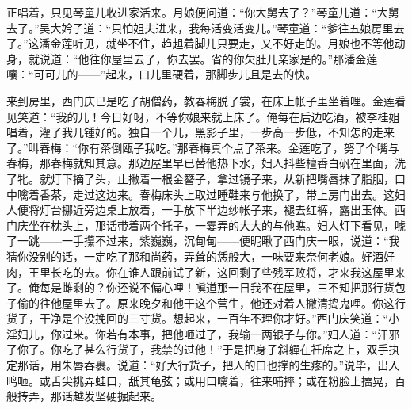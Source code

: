 正唱着，只见琴童儿收进家活来。月娘便问道：“你大舅去了？”琴童儿道：“大舅去了。”吴大妗子道：“只怕姐夫进来，我每活变活变儿。”琴童道：“爹往五娘房里去了。”这潘金莲听见，就坐不住，趋趄着脚儿只要走，又不好走的。月娘也不等他动身，就说道：“他往你屋里去了，你去罢。省的你欠肚儿亲家是的。”那潘金莲嚷：“可可儿的——”起来，口儿里硬着，那脚步儿且是去的快。

来到房里，西门庆已是吃了胡僧药，教春梅脱了裳，在床上帐子里坐着哩。金莲看见笑道：“我的儿！今日好呀，不等你娘来就上床了。俺每在后边吃酒，被李桂姐唱着，灌了我几锺好的。独自一个儿，黑影子里，一步高一步低，不知怎的走来了。”叫春梅：“你有茶倒瓯子我吃。”那春梅真个点了茶来。金莲吃了，努了个嘴与春梅，那春梅就知其意。那边屋里早已替他热下水，妇人抖些檀香白矾在里面，洗了牝。就灯下摘了头，止撇着一根金簪子，拿过镜子来，从新把嘴唇抹了脂胭，口中噙着香茶，走过这边来。春梅床头上取过睡鞋来与他换了，带上房门出去。这妇人便将灯台挪近旁边桌上放着，一手放下半边纱帐子来，褪去红裤，露出玉体。西门庆坐在枕头上，那话带着两个托子，一霎弄的大大的与他瞧。妇人灯下看见，唬了一跳——一手攥不过来，紫巍巍，沉甸甸——便昵瞅了西门庆一眼，说道：“我猜你没别的话，一定吃了那和尚药，弄耸的恁般大，一味要来奈何老娘。好酒好肉，王里长吃的去。你在谁人跟前试了新，这回剩了些残军败将，才来我这屋里来了。俺每是雌剩的？你还说不偏心哩！嗔道那一日我不在屋里，三不知把那行货包子偷的往他屋里去了。原来晚夕和他干这个营生，他还对着人撇清捣鬼哩。你这行货子，干净是个没挽回的三寸货。想起来，一百年不理你才好。”西门庆笑道：“小淫妇儿，你过来。你若有本事，把他咂过了，我输一两银子与你。”妇人道：“汗邪了你了。你吃了甚么行货子，我禁的过他！”于是把身子斜軃在衽席之上，双手执定那话，用朱唇吞裹。说道：“好大行货子，把人的口也撑的生疼的。”说毕，出入鸣咂。或舌尖挑弄蛙口，舐其龟弦；或用口噙着，往来哺摔；或在粉脸上擂晃，百般抟弄，那话越发坚硬掘起来。

